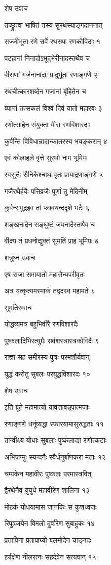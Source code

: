 शेष उवाच

तच्छ्रुत्वा भाषितं तस्य सुरथस्याङ्गदाननात्

सज्जीभूता रणे सर्वे रथस्था रणकोविदाः १

पटहानां निनादोऽभूद्भेरीनादस्तथैव च

वीराणां गर्जनानादाः प्रादुर्भूता रणाङ्गणे २

रथचीत्कारशब्देन गजानां बृंहितेन च

व्याप्तं तत्सकलं विश्वं दिवं यातो महारवः ३

रणोत्साहेन संयुक्ता वीरा रणविशारदाः

कुर्वन्ति विविधान्नादान्कातरस्य भयङ्करान् ४

एवं कोलाहले वृत्ते सुरथो नाम भूमिपः

स्वसुतैः सैनिकैश्चाथ वृतः प्रायाद्रणाङ्गणे ५

गजैरथैर्हयैः पत्तिव्रजैः पूर्णां तु मेदिनीम्

कुर्वन्समुद्रइव तां प्लावयन्ददृशे भटैः ६

शङ्खनादेन सङ्घुष्टं जयनादैस्तथैव च

वीक्ष्य तं प्रधनोद्युक्तं सुमतिं प्राह भूमिपः ७

शत्रुघ्न उवाच

एष राजा समायातो महासैन्यपरीवृतः

अत्र यत्कृत्यमस्माकं तद्वदस्व महामते ८

सुमतिरुवाच

योद्धव्यमत्र बहुभिर्वीरै रणविशारदैः

पुष्कलादिभिरत्युग्रैः सर्वशस्त्रास्त्रकोविदैः ९

राज्ञा सह समीरस्य पुत्रः परमशौर्यवान्

युद्धं करोतु सुबलः परयुद्धविशारदः १०

शेष उवाच

इति ब्रूते महामात्यो यावत्तावन्नृपात्मजाः

रणाङ्गणे धनूंष्यद्धा स्फारयामासुरुद्धताः ११

तान्वीक्ष्य योधाः सुबलाः पुष्कलाद्या रणोत्कटाः

अभिजग्मुः स्यन्दनैः स्वैर्धनुर्बाणकरा मताः १२

चम्पकेन महावीरः पुष्कलः परमास्त्रवित्

द्वैरथेनैव युयुधे महावीरेण शालिना १३

मोहकं योधयामास जानकिः स कुशध्वजः

रिपुञ्जयेन विमलो दुर्वारेण सुबाहुकः १४

प्रतापिना प्रतापाग्र्यो बलमोदेन चाङ्गदः

हर्यक्षेण नीलरत्नः सहदेवेन सत्यवान् १५

